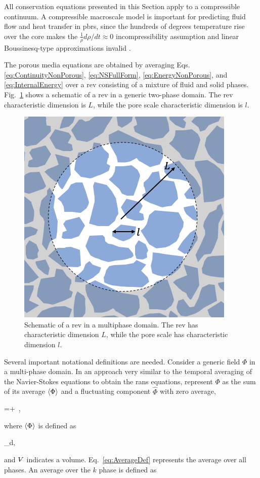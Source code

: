 All conservation equations presented in this Section apply to a compressible continuum. A compressible macroscale model is important for predicting fluid flow and heat transfer in \glspl{pbr}, since the hundreds of degrees temperature rise over the core makes the \(\frac{1}{\rho}d\rho/dt\approx0\) incompressibility assumption and linear Boussinesq-type approximations invalid \cite{elmo}. 

The porous media equations are obtained by averaging Eqs. \eqref{eq:ContinuityNonPorous}, \eqref{eq:NSFullForm}, \eqref{eq:EnergyNonPorous}, and \eqref{eq:InternalEnergy} over a \gls{rev} consisting of a mixture of fluid and solid phases. Fig.\ \ref{fig:rev} shows a schematic of a \gls{rev} in a generic two-phase domain. The \gls{rev} characteristic dimension is \(L\), while the pore scale characteristic dimension is \(l\).

\begin{figure}[!h]
\centering
\includegraphics[width=0.4\linewidth]{figs/rev.png}
\caption{Schematic of a \gls{rev} in a multiphase domain. The \gls{rev} has characteristic dimension \(L\), while the pore scale has characteristic dimension \(l\).}
\label{fig:rev}
\end{figure}

\noindent Several important notational definitions are needed. Consider a generic field \(\Phi\) in a multi-phase domain. In an approach very similar to the temporal averaging of the Navier-Stokes equations to obtain the \gls{rans} equations, represent \(\Phi\) as the sum of its average \(\langle\Phi\rangle\) and a fluctuating component \(\hat{\Phi}\) with zero average,

\beq
\label{eq:PM_back}
\Phi=\la\Phi\ra+\hat{\Phi}\ ,
\eeq

\noindent where \(\langle\Phi\rangle\) is defined as

\beq
\label{eq:AverageDef}
\la\Phi\ra\equiv{}\int_{\volume}\Phi d\volume ,
\eeq

\noindent and \(\volume\) indicates a volume. Eq.\ \eqref{eq:AverageDef} represents the average over all phases. An average over the \(k\) phase is defined as

